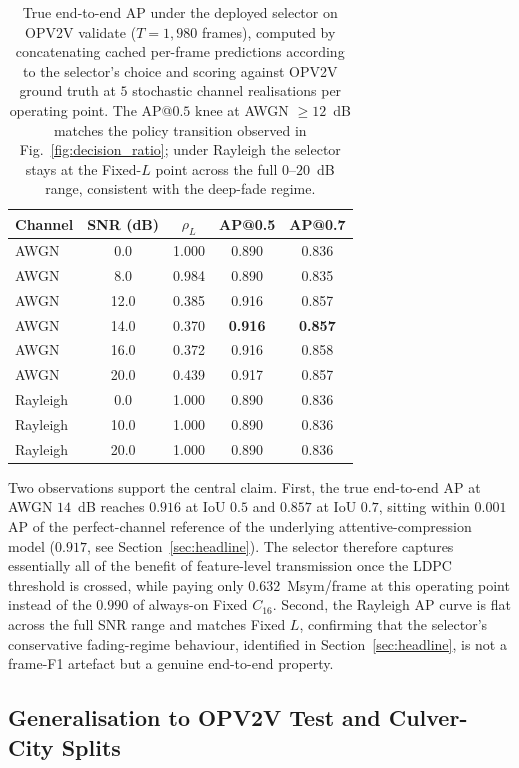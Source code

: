 \documentclass[journal]{IEEEtran}
\begin{document}
\begin{table}[t]
\centering
\caption{True end-to-end AP under the deployed selector on OPV2V validate ($T=1{,}980$ frames), computed by concatenating cached per-frame predictions according to the selector's choice and scoring against OPV2V ground truth at $5$ stochastic channel realisations per operating point. The AP@$0.5$ knee at AWGN $\ge 12$~dB matches the policy transition observed in Fig.~\ref{fig:decision_ratio}; under Rayleigh the selector stays at the Fixed-$L$ point across the full $0$--$20$~dB range, consistent with the deep-fade regime.}\label{tab:true_e2e}
\begin{tabular}{lcccc}
\toprule
Channel & SNR (dB) & $\rho_L$ & AP@0.5 & AP@0.7 \\
\midrule
AWGN     & 0.0  & 1.000 & 0.890 & 0.836 \\
AWGN     & 8.0  & 0.984 & 0.890 & 0.835 \\
AWGN     & 12.0 & 0.385 & 0.916 & 0.857 \\
AWGN     & 14.0 & 0.370 & \textbf{0.916} & \textbf{0.857} \\
AWGN     & 16.0 & 0.372 & 0.916 & 0.858 \\
AWGN     & 20.0 & 0.439 & 0.917 & 0.857 \\
Rayleigh & 0.0  & 1.000 & 0.890 & 0.836 \\
Rayleigh & 10.0 & 1.000 & 0.890 & 0.836 \\
Rayleigh & 20.0 & 1.000 & 0.890 & 0.836 \\
\bottomrule
\end{tabular}
\end{table}

Two observations support the central claim. First, the true end-to-end AP at AWGN $14$~dB reaches $0.916$ at IoU $0.5$ and $0.857$ at IoU $0.7$, sitting within $0.001$ AP of the perfect-channel reference of the underlying attentive-compression model ($0.917$, see Section~\ref{sec:headline}). The selector therefore captures essentially all of the benefit of feature-level transmission once the LDPC threshold is crossed, while paying only $0.632$~Msym/frame at this operating point instead of the $0.990$ of always-on Fixed $C_{16}$. Second, the Rayleigh AP curve is flat across the full SNR range and matches Fixed $L$, confirming that the selector's conservative fading-regime behaviour, identified in Section~\ref{sec:headline}, is not a frame-F1 artefact but a genuine end-to-end property.

\subsection{Generalisation to OPV2V Test and Culver-City Splits}\label{sec:generalisation}
\end{document}
